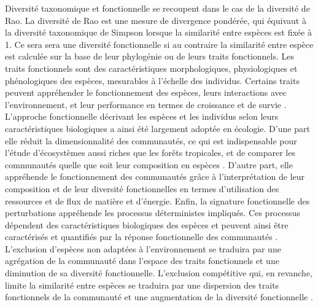 \documentclass[
  11pt,
  french,
  A4paper,
  extrafontsizes,onecolumn,openright
  ]{memoir}
\begin{document}
Diversité taxonomique et fonctionnelle se recoupent dans le cas de la
diversité de Rao. La diversité de Rao est une mesure de divergence
pondérée, qui équivaut à la diversité taxonomique de Simpson lorsque la
similarité entre espèces est fixée à 1. Ce sera sera une diversité
fonctionnelle si au contraire la similarité entre espèce est calculée
sur la base de leur phylogénie ou de leurs traits fonctionnels. Les
traits fonctionnels sont des caractéristiques morphologiques,
physiologiques et phénologiques des espèces, mesurables à l'échelle des
individus. Certains traits peuvent appréhender le fonctionnement des
espèces, leurs interactions avec l'environnement, et leur performance en
termes de croissance et de survie \autocite{Violle2007b}. L'approche
fonctionnelle décrivant les espèces et les individus selon leurs
caractéristiques biologiques a ainsi été largement adoptée en écologie.
D'une part elle réduit la dimensionnalité des communautés, ce qui est
indispensable pour l'étude d'écosystèmes aussi riches que les forêts
tropicales, et de comparer les communautés quelle que soit leur
composition en espèces
\autocites{Begon2006}{Scheiter2013}{Mouillot2013a}{Sakschewski2016}.
D'autre part, elle appréhende le fonctionnement des communautés grâce à
l'interprétation de leur composition et de leur diversité fonctionnelles
en termes d'utilisation des ressources et de flux de matière et
d'énergie. Enfin, la signature fonctionnelle des perturbations
appréhende les processus déterministes impliqués. Ces processus
dépendent des caractéristiques biologiques des espèces et peuvent ainsi
être caractérisés et quantifiés par la réponse fonctionnelle des
communautés \autocite{Funk2017}. L'exclusion d'espèces non adaptées à
l'environnement se traduira par une agrégation de la communauté dans
l'espace des traits fonctionnels et une diminution de sa diversité
fonctionnelle. L'exclusion compétitive qui, en revanche, limite la
similarité entre espèces se traduira par une dispersion des traits
fonctionnels de la communauté et une augmentation de la diversité
fonctionnelle \autocites{McGill2006}{Kunstler2012}.
\end{document}

